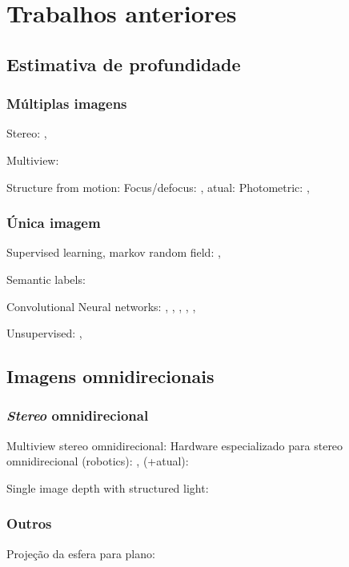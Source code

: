 \documentclass[cic,tc]{iiufrgs}
\begin{document}
\chapter{Trabalhos anteriores}

\section{Estimativa de profundidade}

\subsection{Múltiplas imagens}
Stereo: \citet{stereoSurvey2001},  \citet{stereoSurvey2016}

Multiview: \citet{multiViewStereo2015}

Structure from motion: \citet{structMotion2016}
Focus/defocus: \citet{defocus1987}, atual: \citet{defocus2015}
Photometric: \citet{photometricStereo1989}, \citet{photometricStereo2012}

\subsection{Única imagem}

Supervised learning, markov random field: \citet{Saxena2005}, \citet{Saxena2008}

Semantic labels: \citet{Liu2010}

Convolutional Neural networks: 
\citet{Fayao2015}, \citet{Fayao2016}, \citet{Eigen2014}, \citet{Eigen2015}, \citet{Kuznietsov2017}, \citet{Li2017}

Unsupervised: \citet{Godard2016}, \citet{Zhou2017}


\section{Imagens omnidirecionais}

\subsection{\textit{Stereo} omnidirecional}
Multiview stereo omnidirecional: \citet{Li2001}
Hardware especializado para stereo omnidirecional (robotics): \citet{gluckman1998}, \citet{Koyasu2001} (+atual): \citet{Lin2014}

Single image depth with structured light: \citet{Orghidan2005}

\subsection{Outros}
Projeção da esfera para plano: \citet{sun360}
\end{document}
